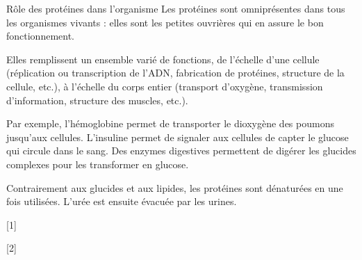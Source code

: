 \begin{doc}{Rôle des protéines dans l'organisme}
  Les protéines sont omniprésentes dans tous les organismes vivants : elles sont les petites ouvrières qui en assure le bon fonctionnement.
  
  Elles remplissent un ensemble varié de fonctions, de l'échelle d'une cellule (réplication ou transcription de l'ADN, fabrication de protéines, structure de la cellule, etc.), à l'échelle du corps entier (transport d'oxygène, transmission d'information, structure des muscles, etc.).

  Par exemple, l'hémoglobine permet de transporter le dioxygène des poumons jusqu'aux cellules.
  L'insuline permet de signaler aux cellules de capter le glucose qui circule dans le sang.
  Des enzymes digestives permettent de digérer les glucides complexes pour les transformer en glucose.

  Contrairement aux glucides et aux lipides, les protéines sont dénaturées en  une fois utilisées.
  L'urée est ensuite évacuée par les urines.
\end{doc}

[1]

[2]

